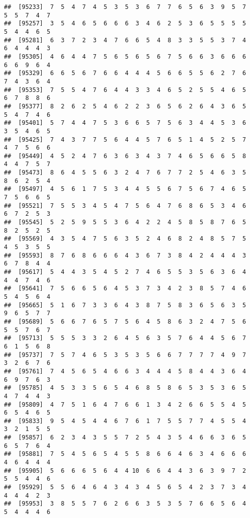 \documentclass[
]{book}
\begin{document}
\begin{verbatim}
##  [95233]  7  5  4  7  4  5  3  5  3  6  7  7  6  5  6  3  9  5  7  5  5  7  4  7
##  [95257]  3  5  4  6  5  6  6  6  3  4  6  2  5  3  6  5  5  5  5  5  4  4  6  5
##  [95281]  6  3  7  2  3  4  7  6  6  5  4  8  3  3  5  5  3  7  4  6  4  4  4  3
##  [95305]  4  6  4  4  7  5  6  5  6  5  6  7  5  6  6  3  6  6  6  6  6  9  6  4
##  [95329]  6  6  5  6  7  6  6  4  4  4  5  6  6  5  5  6  2  7  6  7  4  3  6  4
##  [95353]  7  5  5  4  7  6  4  4  3  3  4  6  5  2  5  5  4  6  5  6  7  8  8  6
##  [95377]  8  2  6  2  5  4  6  2  2  3  6  5  6  2  6  4  3  6  5  5  4  7  4  6
##  [95401]  5  7  4  4  7  5  3  6  6  5  7  5  6  3  4  4  5  3  6  3  5  4  6  5
##  [95425]  7  4  3  7  7  5  6  4  4  5  7  6  5  1  4  5  2  5  7  4  7  5  6  6
##  [95449]  4  5  2  4  7  6  3  6  3  4  3  7  4  6  5  6  6  5  8  4  4  7  5  7
##  [95473]  8  6  4  5  5  6  3  2  4  7  6  7  7  2  5  4  6  3  5  8  6  2  5  4
##  [95497]  4  5  6  1  7  5  3  4  4  5  5  6  7  5  6  7  4  6  5  7  5  6  6  5
##  [95521]  7  5  5  3  4  5  4  7  5  6  4  7  6  8  6  5  3  4  6  6  7  2  5  3
##  [95545]  5  2  5  9  5  5  3  6  4  2  2  4  5  8  5  8  7  6  5  8  2  5  2  5
##  [95569]  4  3  5  4  7  5  6  3  5  2  4  6  8  2  4  8  5  7  5  4  5  3  5  5
##  [95593]  8  7  6  8  6  6  6  4  3  6  7  3  8  4  2  4  4  4  3  6  7  8  4  4
##  [95617]  5  4  4  3  5  4  5  2  7  4  6  5  5  3  5  6  3  6  4  4  4  7  4  6
##  [95641]  7  5  6  6  5  6  4  5  3  7  3  4  2  3  8  5  7  4  6  5  4  5  6  4
##  [95665]  5  1  6  7  3  3  6  4  3  8  7  5  8  3  6  5  6  3  5  9  6  5  7  7
##  [95689]  5  6  6  7  6  5  7  5  6  4  5  8  6  3  2  4  7  5  6  5  5  7  6  7
##  [95713]  5  5  5  3  3  2  6  4  5  6  3  5  7  6  4  4  5  6  7  6  1  5  6  8
##  [95737]  7  5  7  4  6  5  3  5  3  5  6  6  7  7  7  7  4  9  7  3  2  6  7  6
##  [95761]  7  4  5  6  5  4  6  6  3  4  4  4  5  8  4  4  3  6  4  6  9  7  6  3
##  [95785]  4  5  3  3  5  6  5  4  6  8  5  8  6  5  3  5  3  6  5  4  7  4  4  3
##  [95809]  4  7  5  1  6  4  7  6  6  1  3  4  2  6  6  5  5  4  5  6  5  4  6  5
##  [95833]  9  5  4  5  4  4  6  7  6  1  7  5  5  7  7  4  5  5  4  3  2  1  5  5
##  [95857]  6  2  3  4  3  5  5  7  2  5  4  3  5  4  6  6  3  6  5  6  5  7  6  4
##  [95881]  7  5  4  5  6  5  4  5  5  8  6  6  4  6  3  4  6  6  6  4  6  4  4  4
##  [95905]  5  6  6  6  5  6  4  4 10  6  6  4  4  3  6  3  9  7  2  5  5  4  4  6
##  [95929]  5  5  6  4  6  4  3  4  3  4  5  6  5  4  2  3  7  3  4  4  4  4  2  3
##  [95953]  3  8  5  5  7  6  2  6  6  3  5  3  5  7  6  6  5  6  4  5  4  4  4  6

\end{verbatim}
\end{document}
